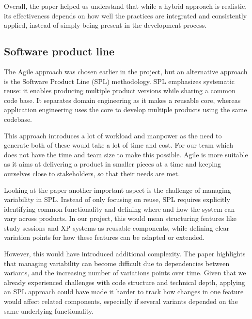 Overall, the paper helped us understand that while a hybrid approach is realistic, its effectiveness depends on how well 
the practices are integrated and consistently applied, instead of simply being present in the development process.


%
\subsection{Software product line}
The Agile approach was chosen earlier in the project, but an alternative approach is the Software Product Line (SPL) methodology. 
SPL emphasizes systematic reuse: it enables producing multiple product versions while sharing a common code base. 
It separates domain engineering as it makes a reusable core, whereas application engineering uses the core to develop multiple products using the same codebase. \cite{Product_Lines}

This approach introduces a lot of workload and manpower as the need to generate both of these would take a lot of time and cost.
For our team which does not have the time and team size to make this possible.
Agile is more suitable as it aims at delivering a product in smaller pieces at a time and keeping ourselves close to stakeholders, so that their needs are met.

Looking at the paper \cite{Software_Variability} another important aspect is the challenge of managing variability in SPL. Instead of only focusing on reuse, SPL requires explicitly identifying common functionality and defining where and how the system can vary across products. In our project, this would mean structuring features like study sessions and XP systems as reusable components, while defining clear variation points for how these features can be adapted or extended.

However, this would have introduced additional complexity. The paper \cite{Software_Variability} highlights that managing variability can become difficult due to dependencies between variants, and the increasing number of variations points over time. Given that we already experienced challenges with code structure and technical depth, applying an SPL approach could have made it harder to track how changes in one feature would affect related components, especially if several variants depended on the same underlying functionality. 


